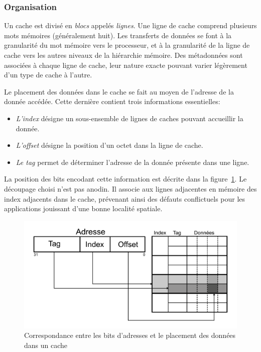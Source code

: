 \subsubsection{Organisation}

Un cache est divisé en \emph{blocs} appelés \emph{lignes}.
Une ligne de cache comprend plusieurs mots mémoires (généralement huit).
Les transferts de données se font à la granularité du mot mémoire vers le processeur, et à la granularité de la ligne de cache vers les autres niveaux de la hiérarchie mémoire.
Des métadonnées sont associées à chaque ligne de cache, leur nature exacte pouvant varier légèrement d'un type de cache à l'autre.

Le placement des données dans le cache se fait au moyen de l'adresse de la donnée accédée.
Cette dernière contient trois informations essentielles: 
\begin{itemize}
	\item \emph{L'index} désigne un sous-ensemble de lignes de caches pouvant accueillir la donnée.
	\item \emph{L'offset} désigne la position d'un octet dans la ligne de cache.
	\item \emph{Le tag} permet de déterminer l'adresse de la donnée présente dans une ligne.
\end{itemize}

La position des bits encodant cette information est décrite dans la figure~\ref{fig:addresse_cache}.
Le découpage choisi n'est pas anodin.
Il associe aux lignes adjacentes en mémoire des index adjacents dans le cache, prévenant ainsi des défauts conflictuels pour les applications jouissant d'une bonne localité spatiale.

\begin{figure}[!h]
	\centering
	\includegraphics[width=0.9\linewidth]{graphics/figures/cache-adresse.pdf}
	\caption{\label{fig:addresse_cache}Correspondance entre les bits d'adresses et le placement des données dans un cache}
\end{figure}

